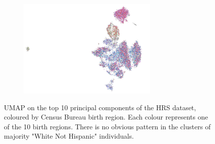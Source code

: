 \documentclass[12pt]{pnas-new}
\begin{document}
\begin{figure}
    \centering
    \begin{subfigure}{\textwidth}
    \includegraphics[width=0.75\textwidth]{images/HRS_1000G_NP1_UMAP_PC10_NC2_NN15_MD05_pca_1kgp_onto_hrs_umap_1kgp_onto_hrs_2018112221116_born.pdf}
    \end{subfigure}
    \caption{UMAP on the top 10 principal components of the HRS dataset, coloured by Census Bureau birth region. Each colour represents one of the 10 birth regions. There is no obvious pattern in the clusters of majority "White Not Hispanic" individuals.}
    \label{fig:supp_hrs_born}
\end{figure}
\end{document}
